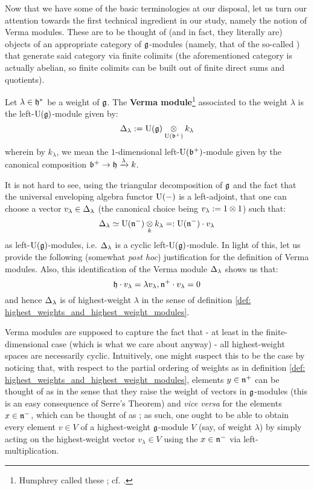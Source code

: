         Now that we have some of the basic terminologies at our disposal, let us turn our attention towards the first technical ingredient in our study, namely the notion of Verma modules. These are to be thought of (and in fact, they literally are) objects of an appropriate category of $\mathfrak{g}$-modules (namely, that of the so-called ) that generate said category via finite colimits (the aforementioned category is actually abelian, so finite colimits can be built out of finite direct sums and quotients).
        \begin{definition} \label{def: verma_modules}
            Let $\lambda \in \mathfrak{h}^*$ be a weight of $\mathfrak{g}$. The \textbf{Verma module}\footnote{Humphrey called these ; cf. \cite[Subsection 20.2]{humphreys_lie_algebras}.} associated to the weight $\lambda$ is the left-$\mathrm{U}(\mathfrak{g})$-module given by:
                $$\standard_{\lambda} := \rmU(\g) \tensor_{\rmU(\b^+)} k_{\lambda}$$
            wherein by $k_{\lambda}$, we mean the $1$-dimensional left-$\mathrm{U}(\mathfrak{b}^+)$-module given by the canonical composition $\mathfrak{b}^+ \to \mathfrak{h} \xrightarrow[]{\lambda} k$.
        \end{definition}
        \begin{remark}
            It is not hard to see, using the triangular decomposition of $\mathfrak{g}$ and the fact that the universal enveloping algebra functor $\mathrm{U}(-)$ is a left-adjoint, that one can choose a vector $v_{\lambda} \in \Delta_{\lambda}$ (the canonical choice being $v_{\lambda} := 1 \tensor 1$) such that:
                $$\standard_{\lambda} \cong \rmU(\n^-) \tensor_k k_{\lambda} =: \rmU(\n^-) \cdot v_{\lambda}$$
            as left-$\mathrm{U}(\mathfrak{g})$-modules, i.e. $\Delta_{\lambda}$ is a cyclic left-$\mathrm{U}(\mathfrak{g})$-module. In light of this, let us provide the following (somewhat \textit{post hoc}) justification for the definition of Verma modules. Also, this identification of the Verma module $\Delta_{\lambda}$ shows us that:
                $$\mathfrak{h} \cdot v_{\lambda} = \lambda v_{\lambda}, \mathfrak{n}^+ \cdot v_{\lambda} = 0$$
            and hence $\Delta_{\lambda}$ is of highest-weight $\lambda$ in the sense of definition \ref{def: highest_weights_and_highest_weight_modules}.
        
            Verma modules are supposed to capture the fact that - at least in the finite-dimensional case (which is what we care about anyway) - all highest-weight spaces are necessarily cyclic. Intuitively, one might suspect this to be the case by noticing that, with respect to the partial ordering of weights as in definition \ref{def: highest_weights_and_highest_weight_modules}, elements $y \in \mathfrak{n}^+$ can be thought of as  in the sense that they raise the weight of vectors in $\mathfrak{g}$-modules (this is an easy consequence of Serre's Theorem) and \textit{vice versa} for the elements $x \in \mathfrak{n}^-$, which can be thought of as ; as such, one ought to be able to obtain every element $v \in V$ of a highest-weight $\mathfrak{g}$-module $V$ (say, of weight $\lambda$) by simply acting on the highest-weight vector $v_{\lambda} \in V$ using the  $x \in \mathfrak{n}^-$ via left-multiplication.
        \end{remark}
        
